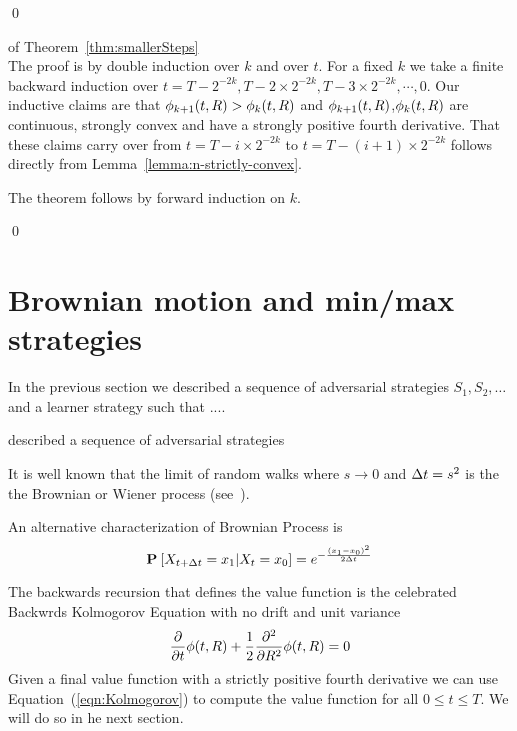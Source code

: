 \documentclass{article}[12pt]
\begin{document}
\qed

\proof  of Theorem~\ref{thm:smallerSteps} \\
The proof is by double induction over $k$ and over $t$.
For a fixed $k$ we take a finite backward induction over
$t=T-2^{-2k},T-2 \times 2^{-2k},T-3 \times 2^{-2k},\cdots,0$.
Our inductive claims are that $\phi_{k+1}(t,R) > \phi_{k}(t,R)$ and
$\phi_{k+1}(t,R)$,$\phi_{k}(t,R)$ are continuous, strongly convex and
have a strongly positive fourth derivative. That these claims carry over
from $t=T-i \times 2^{-2k}$ to  $t=T-(i+1) \times 2^{-2k}$ follows
directly from Lemma~\ref{lemma:n-strictly-convex}.

The theorem follows by forward induction on $k$.

\qed


\iffalse
Next, we consider the discrete time version of $\learnerM^2$:
(Eqn~\ref{eqn:learner-strat-2})
\begin{eqnarray} \label{eqn:learner-strat-2c}
  \learnerM^{2d}(t_{i},\R) =  \frac{1}{Z^{2d}}
  \left. \frac{\partial}{\partial r} \right|_{r=\R}
  \pot(t_{i}+s_{i}^2,r)
  \\
  \mbox{ where } Z^{2d} = \E{\R \sim
  \state(t_i)}{\left. \frac{\partial}{\partial r} \right|_{r=\R} \pot(t_{i}+s_{i}^2,r)} \nonumber
\end{eqnarray}
\fi

\section{Brownian motion and min/max strategies}

In the previous section we described a sequence of adversarial
strategies $S_1,S_2,\ldots$ and a learner strategy such that ....

described a sequence of adversarial
strategies

It is well known that the limit of random walks where $s \to 0$ and
$\Delta t=s^2$ is the the Brownian or Wiener process
(see~\cite{kac1947random}).

An alternative characterization of Brownian Process is
$$ {\bf P}_{}\left[ X_{t+\Delta t}=x_1 | X_t=x_0 \right]=e^{-\frac{(x_1-x_0)^2}{2 \Delta t}}$$

The backwards recursion that
defines the value function is the celebrated Backwrds Kolmogorov
Equation with no drift and unit variance
\begin{equation} \label{eqn:Kolmogorov}
  \frac{\partial}{\partial t} \phi(t,R)
  + \frac{1}{2} \frac{\partial^2}{\partial R^2} \phi(t,R)=0
\end{equation}
Given a final value function with a strictly positive fourth
derivative we can use Equation~(\ref{eqn:Kolmogorov}) to compute the
value function for all $0 \leq t \leq T$. We will do so in he next section.
\end{document}
